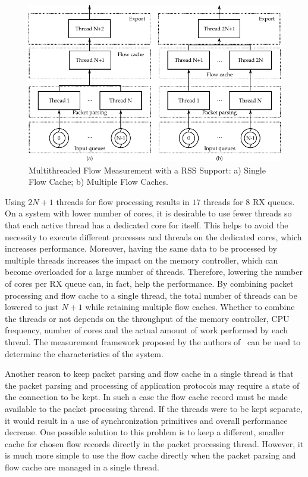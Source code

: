 \begin{figure}[t!]
  \begin{center}
    \includegraphics{figures/c05/exporter-thread-schema}
  \end{center}
  \caption{Multithreaded Flow Measurement with a RSS Support: a) Single Flow Cache; b) Multiple Flow Caches.}
  \label{fig:exporter-thread-schema}
\end{figure}

Using $2N+1$ threads for flow processing results in $17$ threads for $8$ RX queues. On a system with lower number of cores, it is desirable to use fewer threads so that each active thread has a dedicated core for itself. This helps to avoid the necessity to execute different processes and threads on the dedicated cores, which increases performance. Moreover, having the same data to be processed by multiple threads increases the impact on the memory controller, which can become overloaded for a large number of threads. Therefore, lowering the number of cores per RX queue can, in fact, help the performance. By combining packet processing and flow cache to a single thread, the total number of threads can be lowered to just $N+1$ while retaining multiple flow caches. Whether to combine the threads or not depends on the throughput of the memory controller, CPU frequency, number of cores and the actual amount of work performed by each thread. The measurement framework proposed by the authors of~\cite{Gallenmueller-2015-Comparison} can be used to determine the characteristics of the system.


Another reason to keep packet parsing and flow cache in a single thread is that the packet parsing and processing of application protocols may require a state of the connection to be kept. In such a case the flow cache record must be made available to the packet processing thread. If the threads were to be kept separate, it would result in a use of synchronization primitives and overall performance decrease. One possible solution to this problem is to keep a different, smaller cache for chosen flow records directly in the packet processing thread. However, it is much more simple to use the flow cache directly when the packet parsing and flow cache are managed in a single thread.

